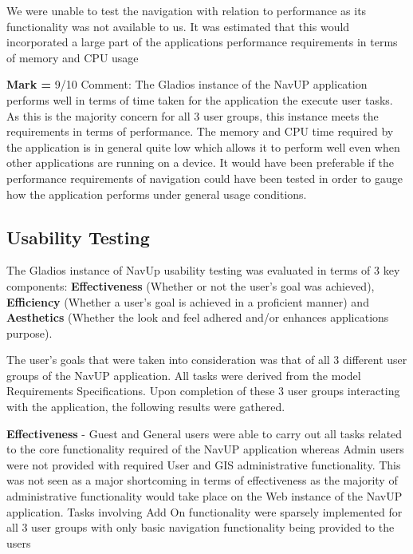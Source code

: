 \documentclass[english]{article}
\begin{document}
		\cleardoublepage
		
		We were unable to test the navigation with relation to performance as its functionality was not available to us. It was estimated that this would incorporated a large part of the applications performance requirements in terms of memory and CPU usage \newline
		
		\textbf{Mark =} 9/10 \newline
		Comment: The Gladios instance of the NavUP application performs well in terms of time taken for the application the execute user tasks. As this is the majority concern for all 3 user groups, this instance meets the requirements in terms of performance. The memory and CPU time required by the application is in general quite low which allows it to perform well even when other applications are running on a device. It would have been preferable if the performance requirements of navigation could have been tested in order to gauge how the application performs under general usage conditions.
		
		\subsection{Usability Testing}\label{subsec:usabilty}  
		
		The Gladios instance of NavUp usability testing was evaluated in terms of 3 key components: \textbf{Effectiveness} (Whether or not the user's goal was achieved), \textbf{Efficiency} (Whether a user's goal is achieved in a proficient manner) and \textbf{Aesthetics} (Whether the look and feel adhered and/or enhances applications purpose). \newline
		
		The user's goals that were taken into consideration was that of all 3 different user groups of the NavUP application. All tasks were derived from the model Requirements Specifications. Upon completion of these 3 user groups interacting with the application, the following results were gathered. \newline
		
		\textbf{Effectiveness} - Guest and General users were able to carry out all tasks related to the core functionality required of the NavUP application whereas Admin users were not provided with required User and GIS administrative functionality. This was not seen as a major shortcoming in terms of effectiveness as the majority of administrative functionality would take place on the Web instance of the NavUP application. Tasks involving Add On functionality were sparsely implemented for all 3 user groups with only basic navigation functionality being provided to the users \newline
		
\end{document}

